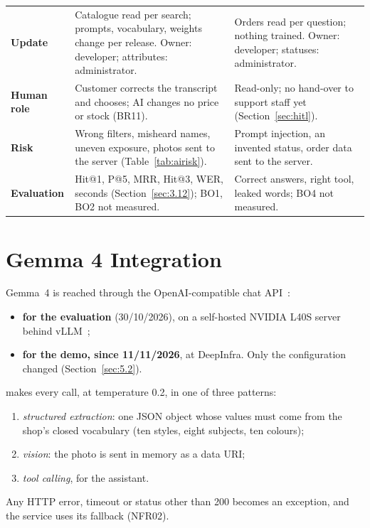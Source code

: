 \begin{longtable}{@{}P{2.4cm}P{6.3cm}P{6.3cm}@{}}
\small\textbf{Update} & \small Catalogue read per search; prompts, vocabulary, weights change per release. Owner: developer; attributes: administrator. & \small Orders read per question; nothing trained. Owner: developer; statuses: administrator.\\
\small\textbf{Human role} & \small Customer corrects the transcript and chooses; AI changes no price or stock (BR11). & \small Read-only; no hand-over to support staff yet (Section~\ref{sec:hitl}).\\
\small\textbf{Risk} & \small Wrong filters, misheard names, uneven exposure, photos sent to the server (Table~\ref{tab:airisk}). & \small Prompt injection, an invented status, order data sent to the server.\\
\small\textbf{Evaluation} & \small Hit@1, P@5, MRR, Hit@3, WER, seconds (Section~\ref{sec:3.12}); BO1, BO2 not measured. & \small Correct answers, right tool, leaked words; BO4 not measured.\\
\bottomrule
\end{longtable}

\section{Gemma 4 Integration}\label{sec:3.4}

Gemma~4 is reached through the OpenAI-compatible chat API~\cite{gemma}:
\begin{itemize}
\item \textbf{for the evaluation} (30/10/2026), on a self-hosted NVIDIA L40S server behind vLLM~\cite{vllm};
\item \textbf{for the demo, since 11/11/2026}, at DeepInfra. Only the configuration changed (Section~\ref{sec:5.2}).
\end{itemize}
 makes every call, at temperature 0.2, in one of three patterns:
\begin{enumerate}
\item \emph{structured extraction}: one JSON object whose values must come from the shop's closed vocabulary (ten
      styles, eight subjects, ten colours);
\item \emph{vision}: the photo is sent in memory as a data URI;
\item \emph{tool calling}, for the assistant.
\end{enumerate}
Any HTTP error, timeout or status other than 200 becomes an exception, and the service uses its fallback (NFR02).

